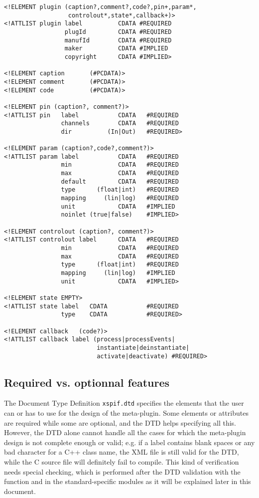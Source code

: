 \begin{verbatim}
<!ELEMENT plugin (caption?,comment?,code?,pin+,param*,
                  controlout*,state*,callback+)>
<!ATTLIST plugin label          CDATA #REQUIRED
                 plugId         CDATA #REQUIRED
                 manufId        CDATA #REQUIRED
                 maker          CDATA #IMPLIED
                 copyright      CDATA #IMPLIED>
		 
<!ELEMENT caption       (#PCDATA)>
<!ELEMENT comment       (#PCDATA)>
<!ELEMENT code          (#PCDATA)>

<!ELEMENT pin (caption?, comment?)>
<!ATTLIST pin   label           CDATA   #REQUIRED
                channels        CDATA   #REQUIRED
                dir          (In|Out)   #REQUIRED>
		
<!ELEMENT param (caption?,code?,comment?)>
<!ATTLIST param label           CDATA   #REQUIRED
                min             CDATA   #REQUIRED
                max             CDATA   #REQUIRED
                default         CDATA   #REQUIRED
                type      (float|int)   #REQUIRED
                mapping     (lin|log)   #REQUIRED
                unit            CDATA   #IMPLIED
                noinlet (true|false)    #IMPLIED>
		
<!ELEMENT controlout (caption?, comment?)>
<!ATTLIST controlout label      CDATA   #REQUIRED 
                min             CDATA   #REQUIRED
                max             CDATA   #REQUIRED
                type      (float|int)   #REQUIRED
                mapping     (lin|log)   #IMPLIED
                unit            CDATA   #IMPLIED>

<!ELEMENT state EMPTY>
<!ATTLIST state label   CDATA           #REQUIRED
                type    CDATA           #REQUIRED>
		
<!ELEMENT callback   (code?)>
<!ATTLIST callback label (process|processEvents|
                          instantiate|deinstantiate|
                          activate|deactivate) #REQUIRED>
\end{verbatim}

\subsection{Required vs. optionnal features}
\noindent The Document Type Definition \verb|xspif.dtd| specifies the elements that the user can or has to use for the design of the meta-plugin. Some elements or attributes are required while some are optional, and the DTD helps specifying all this.\\
\noindent However, the DTD alone cannot handle all the cases for which the meta-plugin design is not complete enough or valid; e.g. if a label contains blank spaces or any bad character for a C++ class name, the XML file is still valid for the DTD, while the C source file will definitely fail to compile. This kind of verification needs special checking, which is performed after the DTD validation with the  function and in the standard-specific modules as it will be explained later in this document.\\

